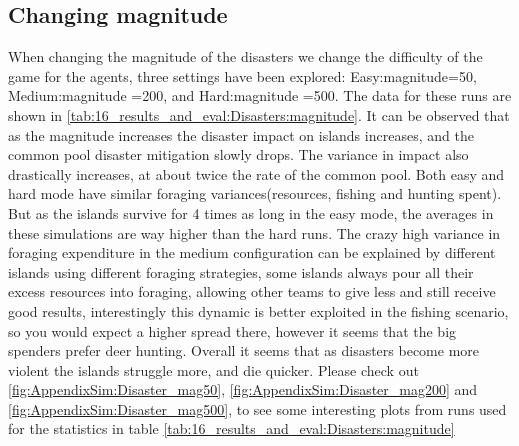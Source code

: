 \subsection{Changing magnitude}
When changing the magnitude of the disasters we change the difficulty of the game for the agents, three settings have been explored: Easy:magnitude=50, Medium:magnitude =200, and Hard:magnitude =500. The data for these runs are shown in \ref{tab:16_results_and_eval:Disasters:magnitude}. It can be observed that as the magnitude increases the disaster impact on islands increases,
and the common pool disaster mitigation slowly drops. The variance in impact also drastically increases, at about twice the rate of the common pool. Both easy and hard mode have similar foraging variances(resources, fishing and hunting spent). But as the islands survive for 4 times as long in the easy mode, the averages in these simulations are way higher than the hard runs. The crazy high variance in foraging expenditure in the medium configuration can be explained by different islands using different foraging strategies, some islands always pour all their excess resources into foraging, allowing other teams to give less and still receive good results, interestingly this dynamic is better exploited in the fishing scenario, so you would expect a higher spread there, however it seems that the big spenders prefer deer hunting. Overall it seems that as disasters become more violent the islands struggle more, and die quicker. Please check out \ref{fig:AppendixSim:Disaster_mag50}, \ref{fig:AppendixSim:Disaster_mag200} and \ref{fig:AppendixSim:Disaster_mag500}, to see some interesting plots from runs used for the statistics in table \ref{tab:16_results_and_eval:Disasters:magnitude}
